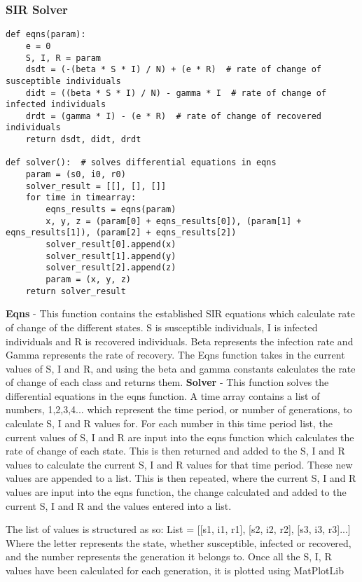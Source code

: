 \documentclass[11pt, a4paper]{article}
\begin{document}
\subsubsection{SIR Solver}
\begin{lstlisting}
def eqns(param):
    e = 0
    S, I, R = param
    dsdt = (-(beta * S * I) / N) + (e * R)  # rate of change of susceptible individuals
    didt = ((beta * S * I) / N) - gamma * I  # rate of change of infected individuals
    drdt = (gamma * I) - (e * R)  # rate of change of recovered individuals
    return dsdt, didt, drdt

def solver():  # solves differential equations in eqns
    param = (s0, i0, r0)
    solver_result = [[], [], []]
    for time in timearray:
        eqns_results = eqns(param)
        x, y, z = (param[0] + eqns_results[0]), (param[1] + eqns_results[1]), (param[2] + eqns_results[2])
        solver_result[0].append(x)
        solver_result[1].append(y)
        solver_result[2].append(z)
        param = (x, y, z)
    return solver_result
\end{lstlisting}
\textbf{Eqns} - This function contains the established SIR equations which calculate rate of change of the different states. S is susceptible individuals, I is infected individuals and R is recovered individuals. Beta represents the infection rate and Gamma represents the rate of recovery. The Eqns function takes in the current values of S, I and R, and using the beta and gamma constants calculates the rate of change of each class and returns them.
\textbf{Solver} - This function solves the differential equations in the eqns function. A time array contains a list of numbers, 1,2,3,4... which represent the time period, or number of generations, to calculate S, I and R values for. For each number in this time period list, the current values of S, I and R are input into the eqns function which calculates the rate of change of each state. This is then returned and added to the S, I and R values to calculate the current S, I and R values for that time period. These new values are appended to a list. This is then repeated, where the current S, I and R values are input into the eqns function, the change calculated and added to the current S, I and R and the values entered into a list. 

The list of values is structured as so: 
List = [[s1, i1, r1], [s2, i2, r2], [s3, i3, r3]...]
Where the letter represents the state, whether susceptible, infected or recovered, and the number represents the generation it belongs to.
Once all the S, I, R values have been calculated for each generation, it is plotted using MatPlotLib
\end{document}
